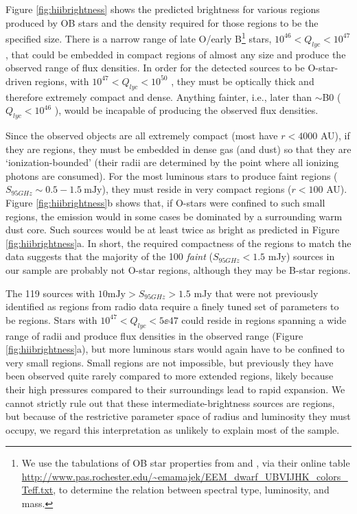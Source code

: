 \documentclass[twocolumn]{aastex61}
\begin{document}
Figure \ref{fig:hiibrightness} shows the predicted brightness for various \hii
regions produced by OB stars and the density required for those \hii regions
to be the specified size.  There is a narrow range of late O/early B\footnote{We use
the tabulations of OB star properties from \citet{Vacca1996a} and
\citet{Pecaut2013a}, via their online table
\url{http://www.pas.rochester.edu/~emamajek/EEM_dwarf_UBVIJHK_colors_Teff.txt},
to determine the relation between spectral type, luminosity, and mass.} stars,
$10^{46} < Q_{lyc} < 10^{47}$ \pers, that could be embedded in compact \hii
regions of almost any size and produce the observed range of flux densities.
In order for the detected sources to be O-star-driven \hii regions, with $10^{47}
< Q_{lyc} < 10^{50}$ \pers, they must be optically thick and therefore
extremely compact and dense.  
Anything fainter, i.e., later than $\sim$B0 ($Q_{lyc}<10^{46}$ \pers), would be
incapable of producing the observed flux densities.

Since the observed objects are all extremely compact (most have $r<4000$ AU),
if they are \hii regions, they must be embedded in dense gas (and dust) so that
they are `ionization-bounded' (their radii are determined by the point where
all ionizing photons are consumed).  For the most luminous stars to produce
faint \hii regions (${S_{95 GHz} \sim 0.5-1.5 \mathrm{~mJy}}$), they must reside
in very compact \hii regions ($r<100$ AU).  Figure \ref{fig:hiibrightness}b
shows that, if O-stars were confined to such small \hii regions, the emission
would in some cases be dominated by a surrounding warm dust core.  Such sources
would be at least twice as bright as predicted in Figure
\ref{fig:hiibrightness}a.  In short, the required compactness of the \hii
regions to match the data suggests that the majority of the 100 \emph{faint}
($S_{95 GHz} < 1.5$ mJy) sources in our sample are probably not O-star \hii
regions, although they may be B-star \hii regions.


The 119 sources with $10 \mathrm{mJy} > S_{95 GHz} > 1.5$ mJy that were not
previously identified as \hii regions from radio data require a finely tuned set of
parameters to be \hii regions.  Stars with $10^{47} < Q_{lyc} < 5\ee{47}$
could reside in \hii regions spanning a wide range of radii and produce
flux densities in the observed range (Figure \ref{fig:hiibrightness}a),
but more luminous stars would again have to be confined to very small \hii
regions.  Small \hii regions are not impossible, but previously they have
been observed quite rarely compared to more extended \hii regions, likely
because their high pressures compared to their surroundings lead to rapid
expansion.  We cannot strictly rule out that these intermediate-brightness
sources are \hii regions, but because of the restrictive parameter space
of radius and luminosity they must occupy, we regard this interpretation
as unlikely to explain most of the sample.
\end{document}
